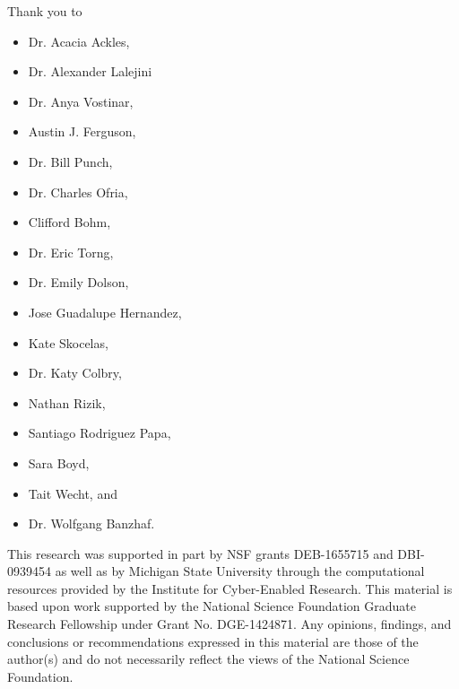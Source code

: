 Thank you to
\begin{itemize}
  \item Dr. Acacia Ackles,
  \item Dr. Alexander Lalejini
  \item Dr. Anya Vostinar,
  \item Austin J. Ferguson,
  \item Dr. Bill Punch,
  \item Dr. Charles Ofria,
  \item Clifford Bohm,
  \item Dr. Eric Torng,
  \item Dr. Emily Dolson,
  \item Jose Guadalupe Hernandez,
  \item Kate Skocelas,
  \item Dr. Katy Colbry,
  \item Nathan Rizik,
  \item Santiago Rodriguez Papa,
  \item Sara Boyd,
  \item Tait Wecht, and
  \item Dr. Wolfgang Banzhaf.
\end{itemize}

This research was supported in part by NSF grants DEB-1655715 and DBI-0939454 as well as by Michigan State University through the computational resources provided by the Institute for Cyber-Enabled Research.
This material is based upon work supported by the National Science Foundation Graduate Research Fellowship under Grant No. DGE-1424871.
Any opinions, findings, and conclusions or recommendations expressed in this material are those of the author(s) and do not necessarily reflect the views of the National Science Foundation.
